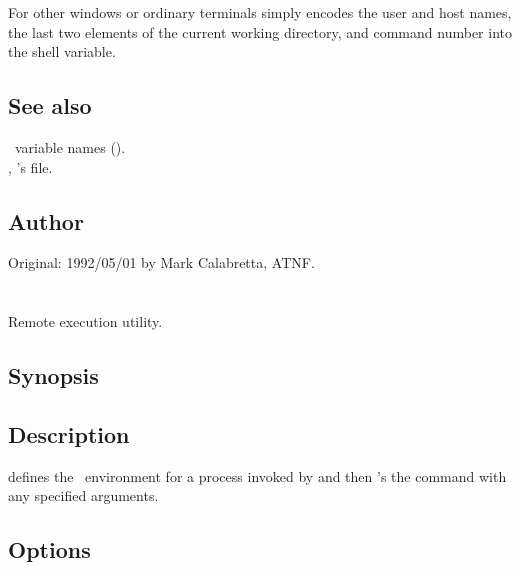 For other windows or ordinary terminals  simply encodes the user
and host names, the last two elements of the current working directory, and
command number into the  shell variable.

\subsection*{See also}

\aipspp\ variable names ().\\
, 's  file.

\subsection*{Author}

Original: 1992/05/01 by Mark Calabretta, ATNF.


\newpage
\section{}
\label{.rshexec}




Remote execution utility.

\subsection*{Synopsis}

\begin{synopsis}
\end{synopsis}

\subsection*{Description}

 defines the \aipspp\ environment for a process invoked by
 and then 's the command with any specified
arguments.

\subsection*{Options}

